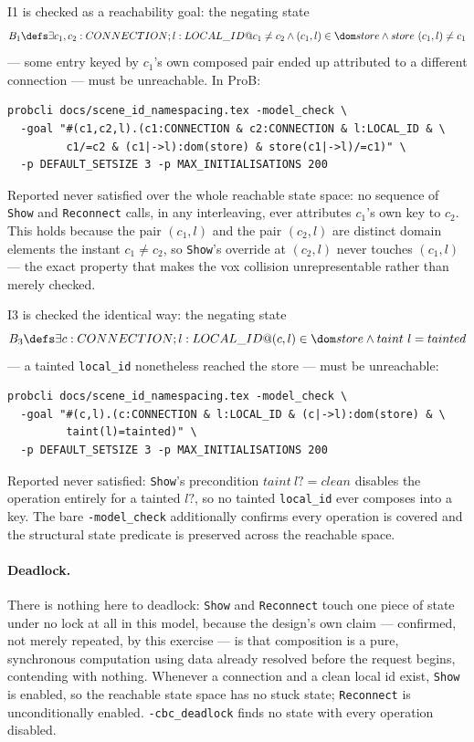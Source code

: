 \documentclass[a4paper,10pt,fleqn]{article}
\begin{document}
I1 is checked as a reachability goal: the negating state
\[
  B_1 \defs \exists c_1, c_2 : CONNECTION; l : LOCAL\_ID @
    c_1 \neq c_2 \land (c_1, l) \in \dom store \land store~(c_1, l) \neq c_1
\]
--- some entry keyed by $c_1$'s own composed pair ended up attributed to a
different connection --- must be unreachable. In ProB:

\begin{verbatim}
probcli docs/scene_id_namespacing.tex -model_check \
  -goal "#(c1,c2,l).(c1:CONNECTION & c2:CONNECTION & l:LOCAL_ID & \
         c1/=c2 & (c1|->l):dom(store) & store(c1|->l)/=c1)" \
  -p DEFAULT_SETSIZE 3 -p MAX_INITIALISATIONS 200
\end{verbatim}

Reported never satisfied over the whole reachable state space: no sequence of
\texttt{Show} and \texttt{Reconnect} calls, in any interleaving, ever
attributes $c_1$'s own key to $c_2$. This holds because the pair $(c_1, l)$
and the pair $(c_2, l)$ are distinct domain elements the instant $c_1 \neq
c_2$, so \texttt{Show}'s override at $(c_2, l)$ never touches $(c_1, l)$ ---
the exact property that makes the vox collision unrepresentable rather than
merely checked.

I3 is checked the identical way: the negating state
\[
  B_3 \defs \exists c : CONNECTION; l : LOCAL\_ID @
    (c, l) \in \dom store \land taint~l = tainted
\]
--- a tainted \texttt{local\_id} nonetheless reached the store --- must be
unreachable:

\begin{verbatim}
probcli docs/scene_id_namespacing.tex -model_check \
  -goal "#(c,l).(c:CONNECTION & l:LOCAL_ID & (c|->l):dom(store) & \
         taint(l)=tainted)" \
  -p DEFAULT_SETSIZE 3 -p MAX_INITIALISATIONS 200
\end{verbatim}

Reported never satisfied: \texttt{Show}'s precondition $taint~l? = clean$
disables the operation entirely for a tainted $l?$, so no tainted
\texttt{local\_id} ever composes into a key. The bare
\texttt{-model\_check} additionally confirms every operation is covered and
the structural state predicate is preserved across the reachable space.

\paragraph{Deadlock.} There is nothing here to deadlock: \texttt{Show} and
\texttt{Reconnect} touch one piece of state under no lock at all in this
model, because the design's own claim --- confirmed, not merely repeated,
by this exercise --- is that composition is a pure, synchronous computation
using data already resolved before the request begins, contending with
nothing. Whenever a connection and a clean local id exist, \texttt{Show} is
enabled, so the reachable state space has no stuck state; \texttt{Reconnect}
is unconditionally enabled. \texttt{-cbc\_deadlock} finds no state with every
operation disabled.
\end{document}

